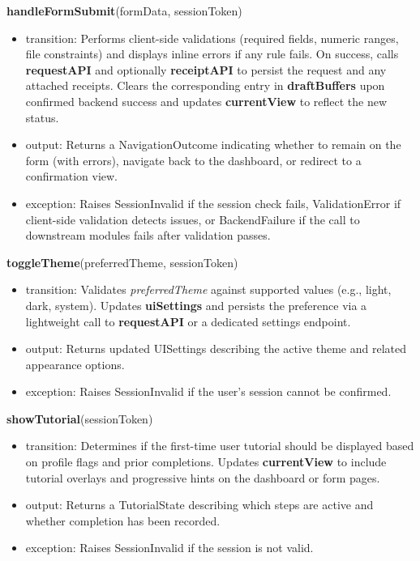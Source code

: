 \documentclass[12pt, titlepage]{article}
\begin{document}
\noindent\textbf{handleFormSubmit}(formData, sessionToken)
\begin{itemize}
  \item transition: Performs client-side validations (required fields, numeric ranges, file constraints) and displays inline errors if any rule fails. On success, calls \textbf{requestAPI} and optionally \textbf{receiptAPI} to persist the request and any attached receipts. Clears the corresponding entry in \textbf{draftBuffers} upon confirmed backend success and updates \textbf{currentView} to reflect the new status.
  \item output: Returns a NavigationOutcome indicating whether to remain on the form (with errors), navigate back to the dashboard, or redirect to a confirmation view.
  \item exception: Raises SessionInvalid if the session check fails, ValidationError if client-side validation detects issues, or BackendFailure if the call to downstream modules fails after validation passes.
\end{itemize}

\noindent\textbf{toggleTheme}(preferredTheme, sessionToken)
\begin{itemize}
  \item transition: Validates \textit{preferredTheme} against supported values (e.g., light, dark, system). Updates \textbf{uiSettings} and persists the preference via a lightweight call to \textbf{requestAPI} or a dedicated settings endpoint.
  \item output: Returns updated UISettings describing the active theme and related appearance options.
  \item exception: Raises SessionInvalid if the user’s session cannot be confirmed.
\end{itemize}

\noindent\textbf{showTutorial}(sessionToken)
\begin{itemize}
  \item transition: Determines if the first-time user tutorial should be displayed based on profile flags and prior completions. Updates \textbf{currentView} to include tutorial overlays and progressive hints on the dashboard or form pages.
  \item output: Returns a TutorialState describing which steps are active and whether completion has been recorded.
  \item exception: Raises SessionInvalid if the session is not valid.
\end{itemize}
\end{document}
